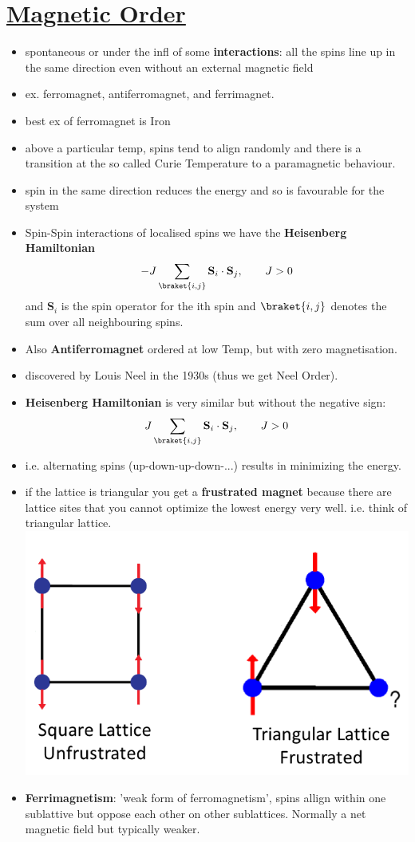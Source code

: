 \section[Magnetic Order]{\hyperlink{toc}{Magnetic Order}}

\begin{itemize}
    \item spontaneous or under the infl of some \textbf{interactions}: all the spins line up in the same direction even without an external magnetic field
    \item ex. ferromagnet, antiferromagnet, and ferrimagnet.
    \item best ex of ferromagnet is Iron
    \item above a particular temp, spins tend to align randomly and there is a transition at the so called Curie Temperature to a paramagnetic behaviour.
    \item spin in the same direction reduces the energy and so is favourable for the system
    \item Spin-Spin interactions of localised spins we have the \textbf{Heisenberg Hamiltonian}
    \[ -J \sum_{\braket{i,j}}  \textbf{S}_i \cdot \textbf{S}_j , \qquad J>0\]
    and $\textbf{S}_i$ is the spin operator for the ith spin and $\braket{i,j}$ denotes the sum over all neighbouring spins.
    \item Also \textbf{Antiferromagnet} ordered at low Temp, but with zero magnetisation.
    \item discovered by Louis Neel in the 1930s (thus we get Neel Order).
    \item \textbf{Heisenberg Hamiltonian} is very similar but without the negative sign:
    \[ J \sum_{\braket{i,j}}  \textbf{S}_i \cdot \textbf{S}_j , \qquad J>0\]
    \item i.e. alternating spins (up-down-up-down-...) results in minimizing the energy.
    \item if the lattice is triangular you get a \textbf{frustrated magnet} because there are lattice sites that you cannot optimize the lowest energy very well. i.e. think of triangular lattice.
    \includegraphics[width= 0.5\linewidth]{Images/Frustration.png}
    \item \textbf{Ferrimagnetism}: 'weak form of ferromagnetism', spins allign within one sublattive but oppose each other on other sublattices. Normally a net magnetic field but typically weaker.
    

\end{itemize}

